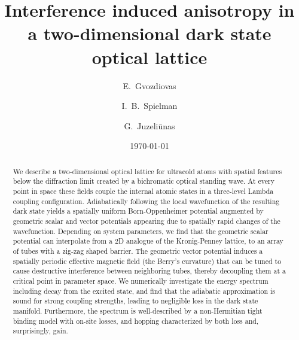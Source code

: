 \documentclass[aps,pra,twocolumn,showpacs,superscriptaddress,floatfix,longbibliography]{revtex4-1}
\begin{document}
\title{Interference induced anisotropy in a two-dimensional dark state optical lattice}

\author{E.~Gvozdiovas}

\author{I.~B.~Spielman}

\author{G.~Juzeliūnas}


\date{\today}

\begin{abstract}
    We describe a two-dimensional optical lattice for ultracold atoms with spatial features below the diffraction limit created by a bichromatic optical standing wave.
    At every point in space these fields couple the internal atomic states in a three-level Lambda coupling configuration.
    Adiabatically following the local wavefunction of the resulting dark state yields a spatially uniform Born-Oppenheimer potential augmented by
    geometric scalar and vector potentials appearing due to spatially rapid changes of the wavefunction.
    Depending on system parameters, we find that the geometric scalar potential can interpolate from a 2D analogue of the Kronig-Penney lattice, to an array of tubes with a zig-zag shaped barrier.
    The geometric vector potential induces a spatially periodic effective magnetic field (the Berry's curvature) that can be tuned to cause destructive interference between neighboring tubes, thereby decoupling them at a critical point in parameter space.
    We numerically investigate the energy spectrum including decay from the excited state, and find that the adiabatic approximation is sound for strong coupling strengths, leading to negligible loss in the dark state manifold.
    Furthermore, the spectrum is well-described by a non-Hermitian tight binding model with on-site losses, and hopping characterized by both loss and, surprisingly, gain.
\end{abstract}

\maketitle
\end{document}
